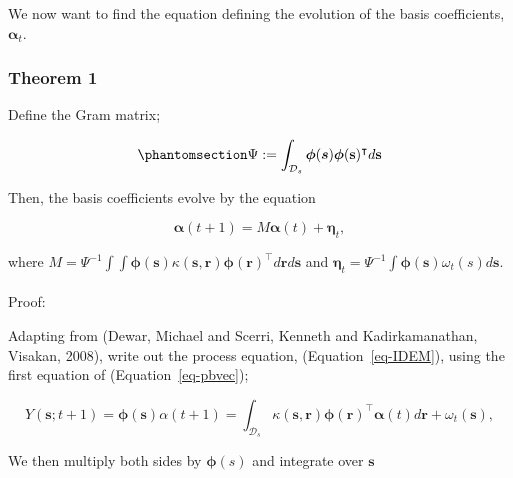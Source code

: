 \documentclass[
  letterpaper,
  DIV=11,
  numbers=noendperiod]{scrartcl}
\makeatletter
\let\oldparagraph\paragraph
\renewcommand{\paragraph}{
    \@ifstar
      \xxxParagraphStar
      \xxxParagraphNoStar
  }
\newcommand{\xxxParagraphStar}[1]{\oldparagraph*{#1}\mbox{}}
\newcommand{\xxxParagraphNoStar}[1]{\oldparagraph{#1}\mbox{}}
\makeatother
\begin{document}
We now want to find the equation defining the evolution of the basis
coefficients, \(\boldsymbol \alpha_t\).

\subsubsection{Theorem 1}\label{theorem-1}

Define the Gram matrix;

\begin{equation}\phantomsection\label{eq-gram}{
\Psi := \int_{\mathcal D_s} \boldsymbol{\mathbf{\phi}}(\boldsymbol s) \boldsymbol{\mathbf{\phi}}(\boldsymbol{\mathbf{s}})^\intercal d\boldsymbol{\mathbf{s}}
}\end{equation}

Then, the basis coefficients evolve by the equation

\[
\boldsymbol{\mathbf{\alpha}}(t+1) = M \boldsymbol{\mathbf{\alpha}}(t) + \boldsymbol{\mathbf{\eta}}_t,
\]

where
\(M = \Psi^{-1} \int\int \boldsymbol{\mathbf{\phi}}(\boldsymbol{\mathbf{s}}) \kappa(\boldsymbol{\mathbf{s}}, \boldsymbol{\mathbf{r}})\boldsymbol{\mathbf{\phi}}(\boldsymbol{\mathbf{r}})^\intercal d\boldsymbol{\mathbf{r}} d \boldsymbol{\mathbf{s}}\)
and
\(\boldsymbol{\mathbf{\eta}}_t =\Psi^{-1} \int \boldsymbol{\mathbf{\phi}}(\boldsymbol{\mathbf{s}})\omega_t(s)d\boldsymbol{\mathbf{s}}\).

\paragraph{Proof:}\label{proof}

Adapting from (Dewar, Michael and Scerri, Kenneth and Kadirkamanathan,
Visakan, 2008), write out the process equation,
(Equation~\ref{eq-IDEM}), using the first equation of
(Equation~\ref{eq-pbvec});

\[
Y(\boldsymbol{\mathbf{s}};t+1) = \boldsymbol{\mathbf{\phi}}(\boldsymbol s) \alpha(t+1) = \int_{\mathcal D_s} \kappa(\boldsymbol{\mathbf{s}}, \boldsymbol{\mathbf{r}}) \boldsymbol{\mathbf{\phi}}(\boldsymbol{\mathbf{r}})^{\intercal}\boldsymbol{\mathbf{\alpha}}(t)d\boldsymbol{\mathbf{r}} + \omega_t(\boldsymbol{\mathbf{s}}),
\]

We then multiply both sides by \(\boldsymbol \phi(s)\) and integrate
over \(\boldsymbol s\)
\end{document}
